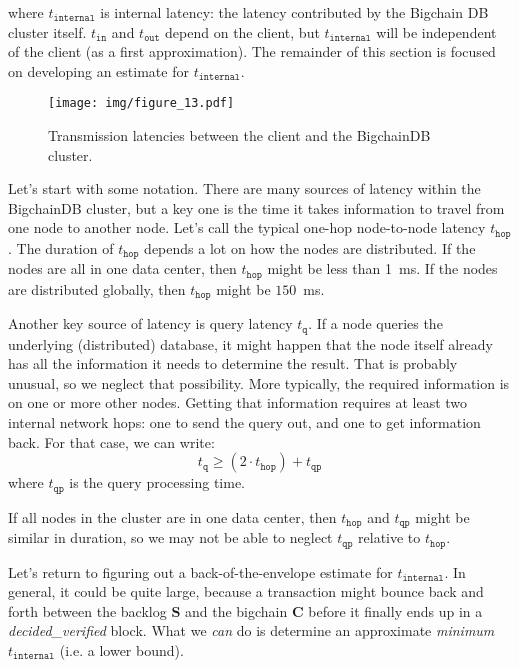 where $t_{\mathtt{internal}}$ is internal latency: the latency contributed by the Bigchain DB cluster itself. 
$t_{\mathtt{in}}$ and $t_{\mathtt{out}}$ depend on the client, but $t_{\mathtt{internal}}$ will be independent of the client (as a first approximation). 
The remainder of this section is focused on developing an estimate for $t_{\mathtt{internal}}$.

\begin{figure}[!ht]
  \centering
  \texttt{[image: img/figure\_13.pdf]}
  \caption{Transmission latencies between the client and the BigchainDB cluster.}
  \label{fig:bigchaindb_tx_latency}
\end{figure}

Let’s start with some notation.
There are many sources of latency within the BigchainDB cluster, but a key one is the time it takes information to travel from one node to another node. 
Let’s call the typical one-hop node-to-node latency $t_{\mathtt{hop}}$. The duration of $t_{\mathtt{hop}}$ depends a lot on how the nodes are distributed. 
If the nodes are all in one data center, then $t_{\mathtt{hop}}$ might be less than 1~ms. If the nodes are distributed globally, then $t_{\mathtt{hop}}$ might be $150$~ms.

Another key source of latency is query latency $t_{\mathtt{q}}$. 
If a node queries the underlying (distributed) database, it might happen that the node itself already has all the information it needs to determine the result. 
That is probably unusual, so we neglect that possibility. More typically, the required information is on one or more other nodes. 
Getting that information requires at least two internal network hops: one to send the query out, and one to get information back. 
For that case, we can write:
\begin{equation}\label{eq:time_query}
t_\mathtt{q} \ge (2 \cdot t_\mathtt{hop}) + t_\mathtt{qp}
\end{equation}
where $t_\mathtt{qp}$ is the query processing time. 

If all nodes in the cluster are in one data center, then $t_\mathtt{hop}$ and $t_\mathtt{qp}$ might be similar in duration, so we may not be able to neglect $t_\mathtt{qp}$ relative to $t_\mathtt{hop}$.

Let’s return to figuring out a back-of-the-envelope estimate for $t_\mathtt{internal}$.
In general, it could be quite large, because a transaction might bounce back and forth between the backlog $\mathbf{S}$ and the bigchain $\mathbf{C}$ before it finally ends up in a \textsf{\textit{decided\_verified}} block.
What we \textit{can} do is determine an approximate \textit{minimum} $t_\mathtt{internal}$ (i.e. a lower bound).

